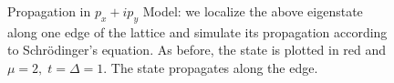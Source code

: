\documentclass[a4paper]{article}
\begin{document}
\begin{figure}
%
%

%
%
\caption{Propagation in $p_x + ip_y$ Model: we localize the above eigenstate along one edge of the lattice and simulate its propagation according to Schr{\"o}dinger's equation.
As before, the state is plotted in red and $\mu = 2,\; t = \Delta = 1$.
The state propagates along the edge.
}%
\label{fig:pxipy_prop}%
\end{figure}
\end{document}

